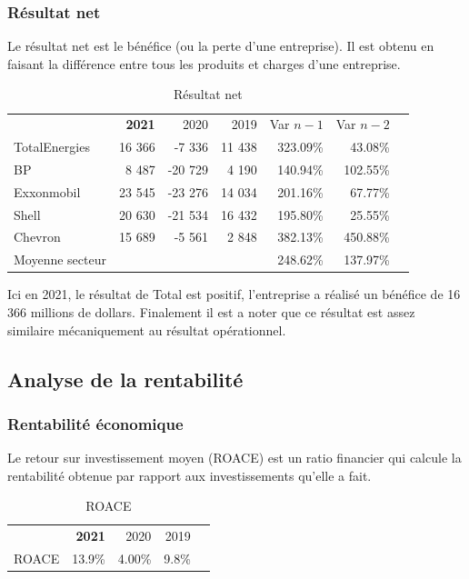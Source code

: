 \documentclass[12pt]{article}
\begin{document}
\subsubsection{Résultat net}
Le résultat net est le bénéfice (ou la perte d'une entreprise). Il est obtenu en faisant la différence entre tous les produits et charges d'une entreprise.
\begin{table}[H]
    \sffamily
    \centering
    \caption{Résultat net}
    \label{table:RE}
    \begin{tabular}{l*{1}{rrrrrr}}
    \toprule
        ~ & \textbf{2021} & 2020 & 2019 & Var $n-1$ & Var $n-2$ \\
    \cmidrule(r){1-1}\cmidrule(r){2-4}\cmidrule(r){5-6}
TotalEnergies & 16 366 & -7 336 & 11 438 & 323.09\% & 43.08\% \\ 
\cmidrule(r){1-1}\cmidrule(r){2-4}\cmidrule(r){5-6}
        BP & 8 487 & -20 729 & 4 190 & 140.94\% & 102.55\% \\ 
        Exxonmobil & 23 545 & -23 276 & 14 034 & 201.16\% & 67.77\% \\ 
        Shell & 20 630 & -21 534 & 16 432 & 195.80\% & 25.55\% \\ 
        Chevron & 15 689 & -5 561 & 2 848 & 382.13\% & 450.88\% \\ 
        \cmidrule(r){1-1}\cmidrule(r){2-4}\cmidrule(r){5-6}
        Moyenne secteur & ~ & ~ & ~ & 248.62\% & 137.97\% \\ 
    \bottomrule
\end{tabular}
\end{table}
Ici en 2021, le résultat de Total est positif, l'entreprise a réalisé un bénéfice de 16 366 millions
de dollars. Finalement il est a noter que ce résultat est assez similaire mécaniquement au résultat 
opérationnel.
\subsection{Analyse de la rentabilité}
\subsubsection{Rentabilité économique}
Le retour sur investissement moyen (ROACE) est un ratio financier qui calcule la rentabilité obtenue par rapport aux investissements qu'elle a fait.
\begin{table}[H]
    \sffamily
    \centering
    \caption{ROACE}
    \label{table:ROACE}
    \begin{tabular}{l*{1}{rrrr}}
    \toprule
        ~ & \textbf{2021} & 2020 & 2019 \\
    \cmidrule(r){1-1}\cmidrule(r){2-4}
        ROACE & 13.9\% 	& 4.00\%	& 9.8\% \\
    \bottomrule
    \end{tabular}
\end{table}
\end{document}
